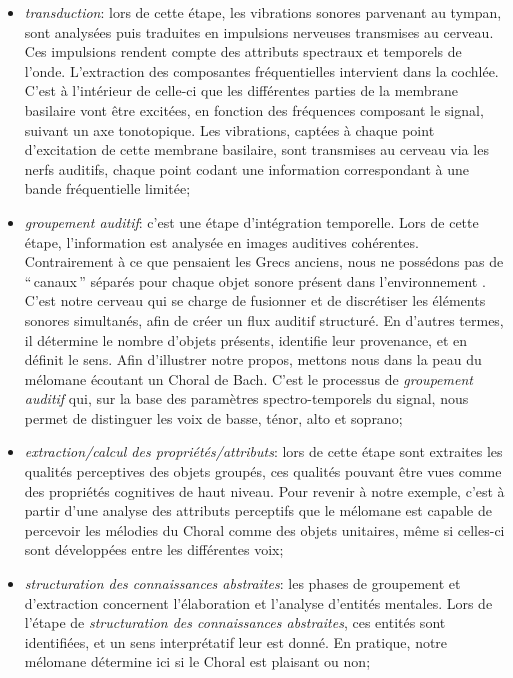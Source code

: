 \begin{itemize}

\item \emph{transduction}: lors de cette étape, les vibrations sonores parvenant au tympan, sont analysées puis traduites en impulsions nerveuses transmises au cerveau. Ces impulsions rendent compte des attributs spectraux et temporels de l'onde. L'extraction des composantes fréquentielles intervient dans la cochlée. C'est à l'intérieur de celle-ci que les différentes parties de la membrane basilaire vont être excitées, en fonction des fréquences composant le signal, suivant un axe tonotopique. Les vibrations, captées à chaque point d’excitation de cette membrane basilaire, sont transmises au cerveau via les nerfs auditifs, chaque point codant une information correspondant à une bande fréquentielle limitée; 
\item \emph{groupement auditif}: c'est une étape d'intégration temporelle. Lors de cette étape, l'information est analysée en images auditives cohérentes. Contrairement à ce que pensaient les Grecs anciens, nous ne possédons pas de ``\,canaux\,'' séparés pour chaque objet sonore présent dans l'environnement \citep{yost1994fundamentals}. C'est notre cerveau qui se charge de fusionner et de discrétiser les éléments sonores simultanés, afin de créer un flux auditif structuré. En d'autres termes, il détermine le nombre d'objets présents, identifie leur provenance, et en définit le sens. Afin d'illustrer notre propos, mettons nous dans la peau du mélomane écoutant un Choral de Bach. C'est le processus de \emph{groupement auditif} qui, sur la base des paramètres spectro-temporels du signal, nous permet de distinguer les voix de basse, ténor, alto et soprano;
\item \emph{extraction/calcul des propriétés/attributs}: lors de cette étape sont extraites les qualités perceptives des objets groupés, ces qualités pouvant être vues comme des propriétés cognitives de haut niveau. Pour revenir à notre exemple, c'est à partir d'une analyse des attributs perceptifs que le mélomane est capable de percevoir les mélodies du Choral comme des objets unitaires, même si celles-ci sont développées entre les différentes voix;
\item \emph{structuration des connaissances abstraites}: les phases de groupement et d'extraction concernent l'élaboration et l'analyse d'entités mentales. Lors de l'étape de \emph{structuration des connaissances abstraites}, ces entités sont identifiées, et un sens interprétatif leur est donné. En pratique, notre mélomane détermine ici si le Choral est plaisant ou non;

\end{itemize}
